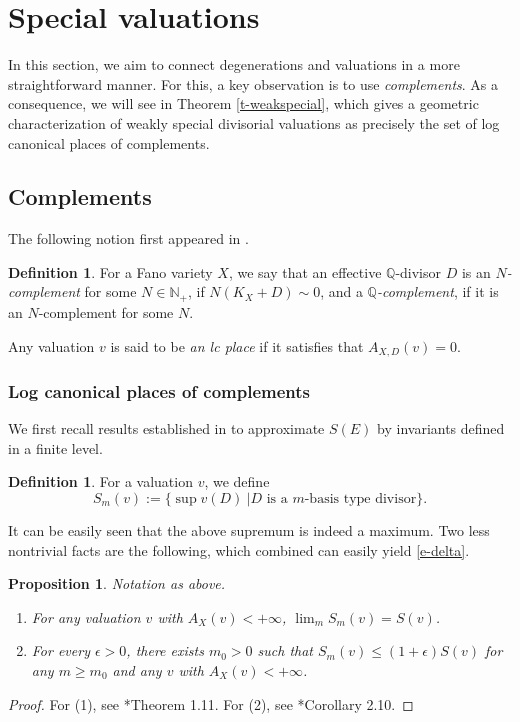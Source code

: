 \documentclass[12pt,reqno]{amsart}%
\newcommand{\bN}{{\mathbb{N} }}
\newtheorem{prop}[thm]{Proposition}
\theoremstyle{definition}
\newtheorem{defn}[thm]{Definition}
\theoremstyle{remark}
\newcommand{\bQ}{{\mathbb{Q}}}
\begin{document}
\section{Special valuations}\label{s-specialvaluation}

In this section, we aim to connect degenerations and valuations in a more straightforward manner.  For this,  a key observation is to use  \emph{complements}. As a consequence, we will  see in Theorem \ref{t-weakspecial}, which gives a geometric characterization of weakly special divisorial valuations as precisely the set of log canonical places of complements. 



\subsection{Complements}\label{ss-complements}
The following notion first appeared in \cite{Sho92}. 
\begin{defn}\label{defn-complements}
For a Fano variety $X$, we say that an effective $\bQ$-divisor $D$ is an {\it $N$-complement} for some $N\in \bN_+$, if $N(K_X+D)\sim 0$, and  a {\it $\bQ$-complement}, if it is an $N$-complement for some $N$.   
\end{defn}
Any valuation $v$ is said to be \emph{an lc place} if it satisfies that $A_{X,D}(v)=0$.


\subsubsection{Log canonical places of complements}
 We first recall results established in \cites{BC11, BJ20} to approximate $S(E)$ by invariants defined in a finite level.  
\begin{defn}For a valuation $v$, we define 
$$S_m(v):=\{\sup v(D) \ | D \mbox{ is a $m$-basis type divisor} \}.$$
\end{defn}
It can be easily seen that the above supremum is indeed a maximum. Two less nontrivial facts are the following, which combined can easily yield \eqref{e-delta}.
\begin{prop}\label{p-Sapproximation}
Notation as above. 
\begin{enumerate}
\item For any valuation $v$ with $A_X(v)<+\infty$,  $\lim_mS_m(v)=S(v)$.
\item For every $\epsilon>0$, there exists $m_0 >0$ such that
$S_m(v) \le (1 + \epsilon )S(v)$ for any $m\ge m_0$ and any $v$ with $A_X(v)<+\infty$. 
\end{enumerate}
\end{prop}
\begin{proof}For (1), see \cite{BC11}*{Theorem 1.11}. For (2), see \cite{BJ20}*{Corollary 2.10}. 
\end{proof}
 
\end{document}
